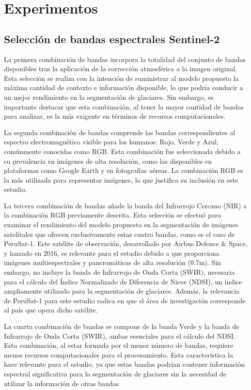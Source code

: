 \documentclass[12pt]{report}
\begin{document}
\chapter{Experimentos}

\section{Selección de bandas espectrales Sentinel-2}

La primera combinación de bandas incorpora la totalidad del conjunto de bandas disponibles tras la aplicación de la corrección atmosférica a la imagen original. Esta selección se realiza con la intención de suministrar al modelo propuesto la máxima cantidad de contexto e información disponible, lo que podría conducir a un mejor rendimiento en la segmentación de glaciares. Sin embargo, es importante destacar que esta combinación, al tener la mayor cantidad de bandas para analizar, es la más exigente en términos de recursos computacionales.

La segunda combinación de bandas comprende las bandas correspondientes al espectro electromagnético visible para los humanos: Rojo, Verde y Azul, comúnmente conocidas como RGB. Esta combinación fue seleccionada debido a su prevalencia en imágenes de alta resolución, como las disponibles en plataformas como Google Earth y en fotografías aéreas. La combinación RGB es la más utilizada para representar imágenes, lo que justifica su inclusión en este estudio.

La tercera combinación de bandas añade la banda del Infrarrojo Cercano (NIR) a la combinación RGB previamente descrita. Esta selección se efectuó para examinar el rendimiento del modelo propuesto en la segmentación de imágenes satelitales que ofrecen exclusivamente estas cuatro bandas, como es el caso de PeruSat-1. Este satélite de observación, desarrollado por Airbus Defence \& Space, y lanzado en 2016, es relevante para el estudio debido a que proporciona imágenes multiespectrales y pancromáticas de alta resolución (0.7m). Sin embargo, no incluye la banda de Infrarrojo de Onda Corta (SWIR), necesaria para el cálculo del Índice Normalizado de Diferencia de Nieve (NDSI), un índice ampliamente utilizado para la segmentación de glaciares. Además, la relevancia de PeruSat-1 para este estudio radica en que el área de investigación corresponde al país que opera dicho satélite.

La cuarta combinación de bandas se compone de la banda Verde y la banda de Infrarrojo de Onda Corta (SWIR), ambas esenciales para el cálculo del NDSI. Esta combinación, al estar formada por el menor número de bandas, requiere menos recursos computacionales para el procesamiento. Esta característica la hace relevante para el estudio, ya que estas bandas podrían contener información espectral significativa para la segmentación de glaciares sin la necesidad de utilizar la información de otras bandas.
\end{document}
